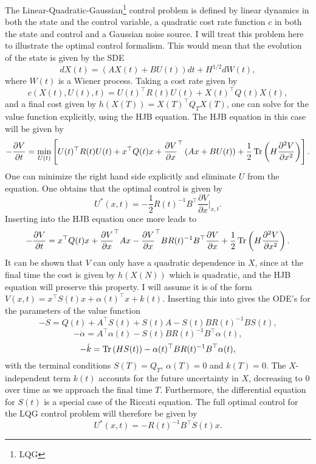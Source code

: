 The Linear-Quadratic-Gaussian\footnote{LQG} control problem is defined by linear dynamics in both the state and the control variable, a quadratic cost rate function
$c$ in both the state and control and a Gaussian noise source. I will treat this problem here to illustrate the optimal control formalism.
This would mean that the evolution of the state is given by the SDE
\begin{equation}
\label{eq:ctl_diff_dyn}
dX(t) = \left(A X(t) + B U(t)\right) dt + H^{1/2} dW(t),
\end{equation}
where $W(t)$ is a Wiener process. Taking a cost rate given by
$$
c(X(t),U(t),t) = U(t)^\top R(t) U(t)+ X(t)^\top Q(t) X(t),
$$
and a final cost given by $h(X(T)) = X(T)^\top Q_T X(T)$, one can solve for the value function explicitly, using the HJB equation. The HJB equation in this case will be given by
$$
-\frac{\partial V}{\partial t} = \min_{U(t)} \left[ U(t)^\top R(t) U(t) +  x^\top Q(t) x + \frac{\partial V}{\partial x}^\top \left(A x  + B U(t)\right) + \frac{1}{2} \operatorname{Tr}\left(H\frac{\partial^2 V}{\partial x^2}\right) \right].
$$
One can minimize the right hand side explicitly and eliminate $U$ from the equation. One obtains that the optimal control is given by
$$
U^*(x,t) = -\frac{1}{2} R(t)^{-1} B^\top\frac{\partial V}{\partial x}\big|_{x,t}.
$$
Inserting into the HJB equation once more leads to
\begin{equation}
\label{eq:lqg_hjb}
-\frac{\partial V}{\partial t} = x^\top Q(t) x +\frac{\partial V}{\partial x}^\top A x -\frac{\partial V}{\partial x}^\top B R(t)^{-1} B^\top \frac{\partial V}{\partial x} + \frac{1}{2}\Tr\left(H\frac{\partial^2 V}{\partial x^2}\right).
\end{equation}
It can be shown that $V$ can only have a quadratic dependence in $X$, since at the final time the cost is given by $h(X(N))$ which is quadratic, and the HJB equation will preserve
this property. I will assume it is of the form $V(x,t) = x^\top S(t) x + \alpha(t)^\top x + k(t)$. Inserting this into 
gives the ODE's for the parameters of the value function
$$
-\dot{S} = Q(t) + A^\top S(t) + S(t) A - S(t) B R(t)^{-1} B S(t),
$$
$$
-\dot{\alpha} = A^\top \alpha(t)-S(t) B R(t)^{-1} B^\top \alpha(t),
$$
$$
-\dot{k} = \operatorname{Tr}\left(H S(t)\right)-\alpha(t)^\top B R(t)^{-1} B^\top \alpha(t),
$$
with the terminal conditions $S(T) = Q_T$, $\alpha(T) = 0$ and $k(T)=0$. The $X$-independent term $k(t)$ accounts for the future uncertainty in $X$, decreasing to $0$ over time as we approach the final time $T$. Furthermore, the differential equation for $S(t)$ is a special case of the Riccati equation. The full optimal control for the LQG control problem will 
therefore be given by
\[
U^*(x,t) = -R(t)^{-1}B^\top S(t) x.
\]

